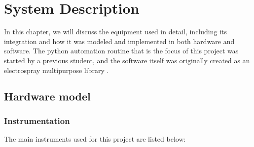 \chapter[System Description]{System Description}
\label{chap:system_description}

In this chapter, we will discuss the equipment used in detail, including its integration and how it was modeled and implemented in both hardware and software. 
The python automation routine that is the focus of this project was started by a previous student\cite{Monica}, and the software itself was originally created as an electrospray multipurpose library \cite{Monica}.

\section{Hardware model}
\label{sec:hardware_model}

\subsection{Instrumentation}
\label{subsec:instrumentation}

The main instruments used for this project are listed below:

